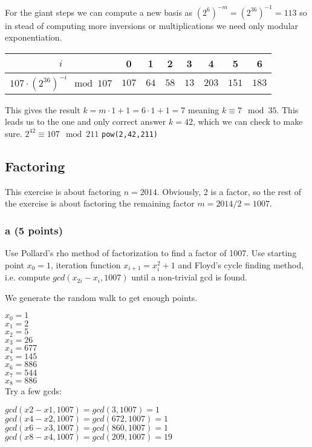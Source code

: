 \documentclass{article}
\begin{document}
For the giant steps we can compute a new basis as $(2^6)^{-m} = (2^{36})^{-1} =
113$
so in stead of computing more inversions or multiplications we need only modular exponentiation.

\begin{tabular}{|c|c|c|c|c|c|c|c|}
\hline
$i $ & 0 & 1 & 2 & 3 & 4 & 5 & 6  \\
\hline
$107 \cdot (2^{36})^{-i} \mod 107$ & $107$ & $64$ & $58$ & $13$ & $203$ & $151$ & $183$ \\
\hline
\end{tabular}

This gives the result $k=m \cdot 1 + 1 = 6 \cdot 1 + 1 = 7$ meaning $k \equiv 7
\mod 35$.
This leads us to the one and only correct answer $k=42$, which we can check to
make sure.
$2^{42} \equiv 107 \mod 211$
\verb|pow(2,42,211)|

\subsection{Factoring}
This exercise is about factoring $n = 2014$. Obviously, 2 is a factor, so
the rest of the exercise is about factoring the remaining factor $m = 2014/2 =
1007$.

\subsubsection{a (5 points)}
Use Pollard’s rho method of factorization to find a factor of 1007.
Use starting point $x_0 = 1$, iteration function $x_{i+1} = x_i^2 + 1$ and
Floyd's cycle finding method, i.e. compute $gcd(x_{2i} - x_i , 1007)$ until
a non-trivial gcd is found.

We generate the random walk to get enough points.

$x_0 = 1$ \\
$x_1 = 2$ \\
$x_2 = 5$ \\
$x_3 = 26$ \\
$x_4 = 677$ \\
$x_5 = 145$ \\
$x_6 = 886$ \\
$x_7 = 544$ \\
$x_8 = 886$ \\

Try a few gcds:

$gcd(x2-x1, 1007) = gcd(3,   1007) = 1$ \\
$gcd(x4-x2, 1007) = gcd(672, 1007) = 1$ \\
$gcd(x6-x3, 1007) = gcd(860, 1007) = 1$ \\
$gcd(x8-x4, 1007) = gcd(209, 1007) = 19$
\end{document}
